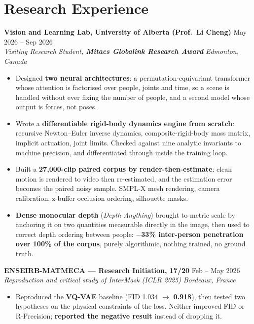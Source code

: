 \documentclass[10pt, letterpaper]{article}
\newcommand{\entry}[4]{%
  \noindent \textbf{#1} \hfill #2 \\
  \textit{#3} \hfill \textit{#4} \par
}
\begin{document}
\section{Research Experience}

\entry{Vision and Learning Lab, University of Alberta (Prof.\ Li Cheng)}{May 2026 -- Sep 2026}%
{Visiting Research Student, \textbf{Mitacs Globalink Research Award}}{Edmonton, Canada}
\begin{itemize}
    \item Designed \textbf{two neural architectures}: a permutation-equivariant transformer whose attention is factorised over people, joints and time, so a scene is handled without ever fixing the number of people, and a second model whose output is forces, not poses.
    \item Wrote a \textbf{differentiable rigid-body dynamics engine from scratch}: recursive Newton--Euler inverse dynamics, composite-rigid-body mass matrix, implicit actuation, joint limits. Checked against nine analytic invariants to machine precision, and differentiated through inside the training loop.
    \item Built a \textbf{27{,}000-clip paired corpus by render-then-estimate}: clean motion is rendered to video then re-estimated, and the estimation error becomes the paired noisy sample. SMPL-X mesh rendering, camera calibration, z-buffer occlusion ordering, silhouette masks.
    \item \textbf{Dense monocular depth} (\textit{Depth Anything}) brought to metric scale by anchoring it on two quantities measurable directly in the image, then used to correct depth ordering between people: \textbf{$-$33\% inter-person penetration over 100\% of the corpus}, purely algorithmic, nothing trained, no ground truth.
\end{itemize}

\vspace{1pt}

\entry{ENSEIRB-MATMECA --- Research Initiation, 17/20}{Feb -- May 2026}%
{Reproduction and critical study of \textit{InterMask} (ICLR 2025)}{Bordeaux, France}
\begin{itemize}
    \item Reproduced the \textbf{VQ-VAE} baseline (FID 1.034 $\to$ \textbf{0.918}), then tested two hypotheses on the physical constraints of the loss. Neither improved FID or R-Precision; \textbf{reported the negative result} instead of dropping it.
\end{itemize}
\end{document}
